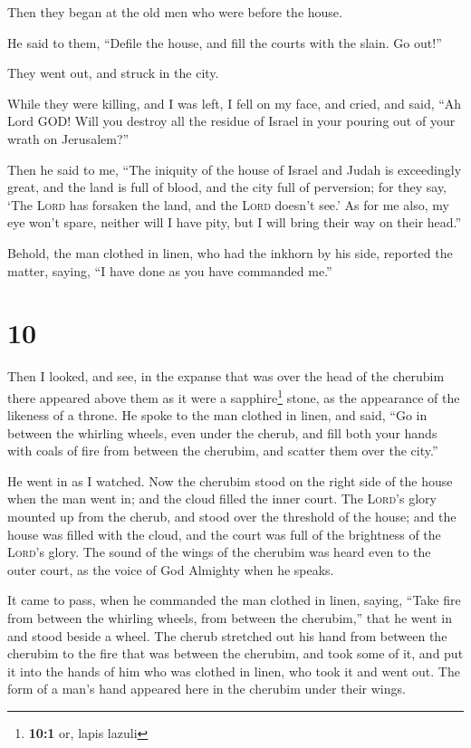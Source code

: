 Then they began at the old men who were before the house.

 He said to them, ``Defile the house, and fill the courts
with the slain. Go out!''

They went out, and struck in the city.

 While they were killing, and I was left, I fell on my
face, and cried, and said, ``Ah Lord GOD! Will you destroy all the
residue of Israel in your pouring out of your wrath on Jerusalem?''

 Then he said to me, ``The iniquity of the house of Israel
and Judah is exceedingly great, and the land is full of blood, and the
city full of perversion; for they say, `The \textsc{Lord} has forsaken
the land, and the \textsc{Lord} doesn't see.'  As for me
also, my eye won't spare, neither will I have pity, but I will bring
their way on their head.''

 Behold, the man clothed in linen, who had the inkhorn by
his side, reported the matter, saying, ``I have done as you have
commanded me.''

\hypertarget{section-9}{%
\section{10}\label{section-9}}

 Then I looked, and see, in the expanse that was over the
head of the cherubim there appeared above them as it were a
sapphire\footnote{\textbf{10:1} or, lapis lazuli} stone, as the
appearance of the likeness of a throne.  He spoke to the
man clothed in linen, and said, ``Go in between the whirling wheels,
even under the cherub, and fill both your hands with coals of fire from
between the cherubim, and scatter them over the city.''

He went in as I watched.  Now the cherubim stood on the
right side of the house when the man went in; and the cloud filled the
inner court.  The \textsc{Lord}'s glory mounted up from
the cherub, and stood over the threshold of the house; and the house was
filled with the cloud, and the court was full of the brightness of the
\textsc{Lord}'s glory.  The sound of the wings of the
cherubim was heard even to the outer court, as the voice of God Almighty
when he speaks.

 It came to pass, when he commanded the man clothed in
linen, saying, ``Take fire from between the whirling wheels, from
between the cherubim,'' that he went in and stood beside a wheel.
 The cherub stretched out his hand from between the
cherubim to the fire that was between the cherubim, and took some of it,
and put it into the hands of him who was clothed in linen, who took it
and went out.  The form of a man's hand appeared here in
the cherubim under their wings.

